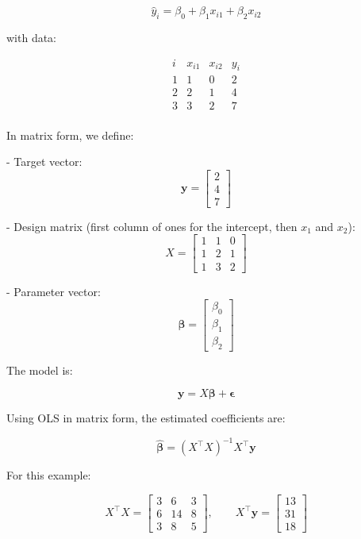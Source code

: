 \[
\hat{y}_i = \beta_0 + \beta_1 x_{i1} + \beta_2 x_{i2}
\]

with data:

\[
\begin{array}{c|c|c|c}
i & x_{i1} & x_{i2} & y_i \\
\hline
1 & 1 & 0 & 2 \\
2 & 2 & 1 & 4 \\
3 & 3 & 2 & 7 \\
\end{array}
\]



In matrix form, we define:

- Target vector:
  \[
  \mathbf{y} =
  \begin{bmatrix}
  2 \\
  4 \\
  7
  \end{bmatrix}
  \]

- Design matrix (first column of ones for the intercept, then $x_1$ and $x_2$):
  \[
  X =
  \begin{bmatrix}
  1 & 1 & 0 \\
  1 & 2 & 1 \\
  1 & 3 & 2
  \end{bmatrix}
  \]

- Parameter vector:
  \[
  \boldsymbol{\beta} =
  \begin{bmatrix}
  \beta_0 \\
  \beta_1 \\
  \beta_2
  \end{bmatrix}
  \]
  
The model is:

\[
\mathbf{y} = X \boldsymbol{\beta} + \boldsymbol{\epsilon}
\]

Using OLS in matrix form, the estimated coefficients are:

\[
\hat{\boldsymbol{\beta}} = (X^\top X)^{-1} X^\top \mathbf{y}
\]

For this example:

\[
X^\top X =
\begin{bmatrix}
3 & 6 & 3 \\
6 & 14 & 8 \\
3 & 8 & 5
\end{bmatrix},
\qquad
X^\top \mathbf{y} =
\begin{bmatrix}
13 \\
31 \\
18
\end{bmatrix}
\]


